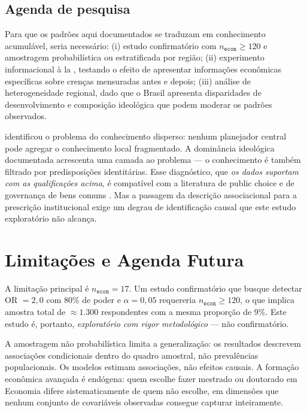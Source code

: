\subsection*{Agenda de pesquisa}

Para que os padrões aqui documentados se traduzam em conhecimento acumulável, seria necessário: (i) estudo confirmatório com $n_{\texttt{econ}} \geq 120$ e amostragem probabilística ou estratificada por região; (ii) experimento informacional à la , testando o efeito de apresentar informações econômicas específicas sobre crenças mensuradas antes e depois; (iii) análise de heterogeneidade regional, dado que o Brasil apresenta disparidades de desenvolvimento e composição ideológica que podem moderar os padrões observados.

 identificou o problema do conhecimento disperso: nenhum planejador central pode agregar o conhecimento local fragmentado. A dominância ideológica documentada acrescenta uma camada ao problema — o conhecimento é também filtrado por predisposições identitárias. Esse diagnóstico, que \textit{os dados suportam com as qualificações acima}, é compatível com a literatura de public choice \cite{buchanan1962calculus} e de governança de bens comuns \cite{ostrom1990governing}. Mas a passagem da descrição associacional para a prescrição institucional exige um degrau de identificação causal que este estudo exploratório não alcança.

\section{Limitações e Agenda Futura}
\label{sec:limitacoes-v2}

A limitação principal é $n_{\texttt{econ}} = 17$. Um estudo confirmatório que busque detectar OR $= 2{,}0$ com 80\% de poder e $\alpha = 0{,}05$ requereria $n_{\texttt{econ}} \geq 120$, o que implica amostra total de $\approx 1.300$ respondentes com a mesma proporção de 9\%. Este estudo é, portanto, \textit{exploratório com rigor metodológico} — não confirmatório.

A amostragem não probabilística limita a generalização: os resultados descrevem associações condicionais dentro do quadro amostral, não prevalências populacionais. Os modelos estimam associações, não efeitos causais. A formação econômica avançada é endógena: quem escolhe fazer mestrado ou doutorado em Economia difere sistematicamente de quem não escolhe, em dimensões que nenhum conjunto de covariáveis observadas consegue capturar inteiramente.

